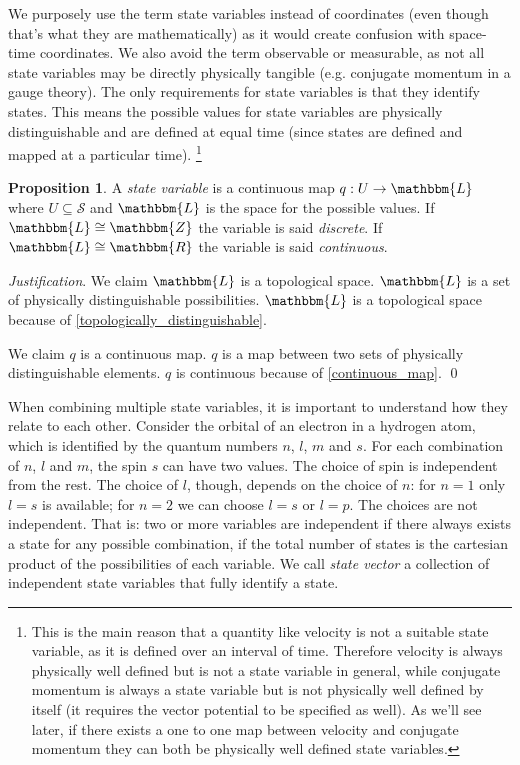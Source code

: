 \documentclass[aps,pra,10pt,twocolumn,floatfix,nofootinbib]{revtex4-1}
\numberwithin{equation}{section}
\theoremstyle{definition}
\newtheorem{prop}[equation]{Proposition}
\newenvironment{justification}{\emph{Justification}.}{\qed}
\begin{document}
We purposely use the term state variables instead of coordinates (even though that's what they are mathematically) as it would create confusion with space-time coordinates. We also avoid the term observable or measurable, as not all state variables may be directly physically tangible (e.g. conjugate momentum in a gauge theory). The only requirements for state variables is that they identify states. This means the possible values for state variables are physically distinguishable and are defined at equal time (since states are defined and mapped at a particular time). \footnote{This is the main reason that a quantity like velocity is not a suitable state variable, as it is  defined over an interval of time. Therefore velocity is always physically well defined but is not a state variable in general, while conjugate momentum is always a state variable but is not physically well defined by itself (it requires the vector potential to be specified as well). As we'll see later, if there exists a one to one map between velocity and conjugate momentum they can both be physically well defined state variables.}

\begin{prop}\label{state_variable}
	A \emph{state variable} is a continuous map $q : U \rightarrow \mathbbm{L}$ where $U \subseteq \mathcal{S}$ and $\mathbbm{L}$ is the space for the possible values. If $\mathbbm{L}\cong \mathbbm{Z}$ the variable is said \emph{discrete}. If $\mathbbm{L}\cong \mathbbm{R}$ the variable is said \emph{continuous}.
\end{prop}

\begin{justification}
	We claim $\mathbbm{L}$ is a topological space. $\mathbbm{L}$ is a set of physically distinguishable possibilities. $\mathbbm{L}$ is a topological space because of \ref{topologically_distinguishable}.
	
	We claim $q$ is a continuous map. $q$ is a map between two sets of physically distinguishable elements. $q$ is continuous because of \ref{continuous_map}.
\end{justification}

When combining multiple state variables, it is important to understand how they relate to each other. Consider the orbital of an electron in a hydrogen atom, which is identified by the quantum numbers $n$, $l$, $m$ and $s$. For each combination of $n$, $l$ and $m$, the spin $s$ can have two values. The choice of spin is independent from the rest. The choice of $l$, though, depends on the choice of $n$: for $n=1$ only $l=s$ is available; for $n=2$ we can choose $l=s$ or $l=p$. The choices are not independent. That is: two or more variables are independent if there always exists a state for any possible combination, if the total number of states is the cartesian product of the possibilities of each variable. We call \emph{state vector} a collection of independent state variables that fully identify a state.
\end{document}
